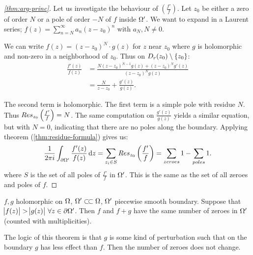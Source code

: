 \begin{proof}[\ref{thm:arg-princ}] Let us investigate the behaviour of $\left( \frac{f'}{f} \right)$. Let $z_0$ be either a zero of order $N$ or a pole of order $-N$ of $f$ inside $\Omega '$. We want to expand in a Laurent series; $f(z) = \sum_{n=N}^\infty a_n (z-z_0)^n$ with $a_N,N \neq 0$.

We can write $f(z)  = (z-z_0)^N \cdot g(z)$ for $z$ near $z_0$ where $g$ is holomorphic and non-zero in a neighborhood of $z_0$. Thus on $D_r (z_0) \setminus \{ z_0 \}$:
\begin{align*}
\frac{f'(z)}{f(z)} &= \frac{N(z-z_0)^{N-1} g(z) + (z-z_0)^N g'(z)}{(z-z_0)^N g(z)}\\
&= \frac{N}{z-z_0}+ \frac{g'(z)}{g(z)}.
\end{align*}

The second term is holomorphic. The first term is a simple pole with residue $N$. Thus $Res_{z_0} \left( \frac{f'}{f} \right) = N$. The same computation on $\frac{g'(z)}{g(z)}$ yields a similar equation, but with $N=0$, indicating that there are no poles along the boundary. Applying theorem (\ref{thm:residue-formula}) gives us:
\begin{align*}
    \frac{1}{2 \pi i} \int_{\partial \om '} \frac{f'(z)}{f(z)} \dif z = \sum_{z_i \in S} \res{z_0}{\frac{f'}{f}} = \sum_{zeroes} 1 - \sum_{poles} 1.
\end{align*}
where $S$ is the set of all poles of $\frac{f'}{f}$ in $\Omega '$. This is the same as the set of all zeroes and poles of $f$.

\end{proof}



\begin{theorem}[Rouché]\label{thm:rouche}

$f,g$ holomorphic on $\Omega$, $\om' \ssubset \om$, $\Omega ' $ piecewise smooth boundary. Suppose that $\abs{f(z)} > \abs{g(z)} \, \forall z \in \partial \Omega '$. Then $f $ and $f+g$ have the same number of zeroes in $\Omega ' $ (counted with multiplicities).

\end{theorem}

\begin{note}

The logic of this theorem is that $g$ is some kind of perturbation such that on the boundary $g$ has less effect than $f$. Then the number of zeroes does not change.

\end{note}

